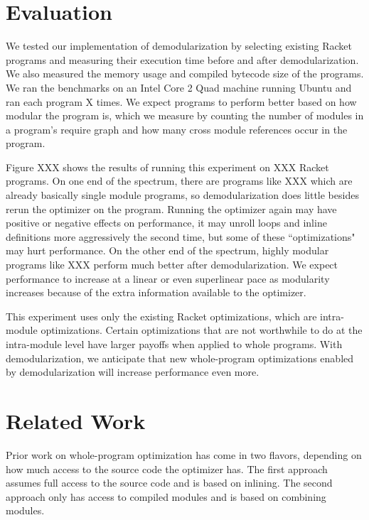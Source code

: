 \documentclass[ms,electronic,letterpaper,lol,lof,lot]{byumsphd}
\begin{document}
\chapter{Evaluation}

We tested our implementation of demodularization by selecting existing Racket programs and measuring their execution time before and after demodularization.
We also measured the memory usage and compiled bytecode size of the programs.
We ran the benchmarks on an Intel Core 2 Quad machine running Ubuntu and ran each program X times.
We expect programs to perform better based on how modular the program is, which we measure by counting the number of modules in a program's require graph and how many cross module references occur in the program.

Figure XXX shows the results of running this experiment on XXX Racket programs. 
On one end of the spectrum, there are programs like XXX which are already basically single module programs, so demodularization does little besides rerun the optimizer on the program. Running the optimizer again may have positive or negative effects on performance, it may unroll loops and inline definitions more aggressively the second time, but some of these ``optimizations" may hurt performance.
On the other end of the spectrum, highly modular programs like XXX perform much better after demodularization.
We expect performance to increase at a linear or even superlinear pace as modularity increases because of the extra information available to the optimizer.

This experiment uses only the existing Racket optimizations, which are intra-module optimizations.
Certain optimizations that are not worthwhile to do at the intra-module level have larger payoffs when applied to whole programs. 
With demodularization, we anticipate that new whole-program optimizations enabled by demodularization will increase performance even more.

\chapter{Related Work}
Prior work on whole-program optimization has come in two flavors, depending on how much access to the source code the optimizer has. The first approach assumes full access to the source code and is based on inlining. The second approach only has access to compiled modules and is based on combining modules.
\end{document}
